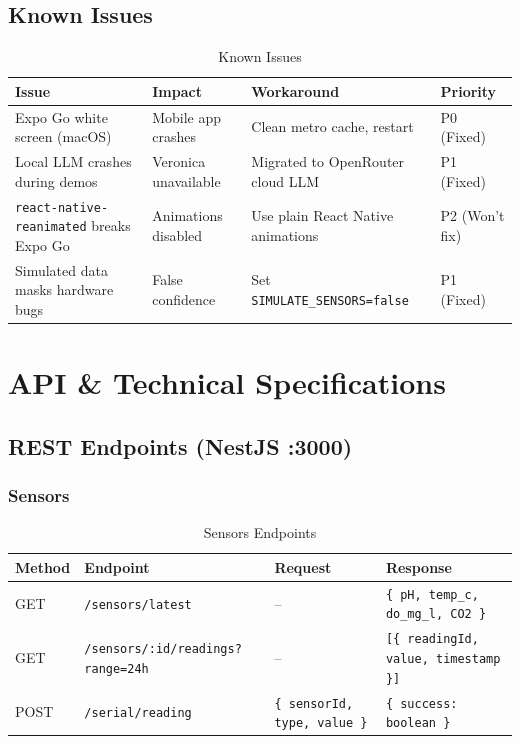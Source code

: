\documentclass[12pt,a4paper,oneside]{article}
\begin{document}
\subsection{Known Issues}
\begin{table}[H]
    \centering\scriptsize
    \begin{tabularx}{\textwidth}{lYll}
        \toprule
        \textbf{Issue} & \textbf{Impact} & \textbf{Workaround} & \textbf{Priority} \\
        \midrule
        Expo Go white screen (macOS) & Mobile app crashes & Clean metro cache, restart & P0 (Fixed) \\
        Local LLM crashes during demos & Veronica unavailable & Migrated to OpenRouter cloud LLM & P1 (Fixed) \\
        \texttt{react-native-reanimated} breaks Expo Go & Animations disabled & Use plain React Native animations & P2 (Won't fix) \\
        Simulated data masks hardware bugs & False confidence & Set \texttt{SIMULATE\_SENSORS=false} & P1 (Fixed) \\
        \bottomrule
    \end{tabularx}
    \caption{Known Issues}
\end{table}

\newpage
\section{API \& Technical Specifications}

\subsection{REST Endpoints (NestJS :3000)}

\subsubsection{Sensors}
\begin{table}[H]
    \centering
    \begin{tabularx}{\textwidth}{llYY}
        \toprule
        \textbf{Method} & \textbf{Endpoint} & \textbf{Request} & \textbf{Response} \\
        \midrule
        GET & \texttt{/sensors/latest} & -- & \texttt{\{ pH, temp\_c, do\_mg\_l, CO2 \}} \\
        GET & \texttt{/sensors/:id/readings?range=24h} & -- & \texttt{[\{ readingId, value, timestamp \}]} \\
        POST & \texttt{/serial/reading} & \texttt{\{ sensorId, type, value \}} & \texttt{\{ success: boolean \}} \\
        \bottomrule
    \end{tabularx}
    \caption{Sensors Endpoints}
\end{table}
\end{document}

